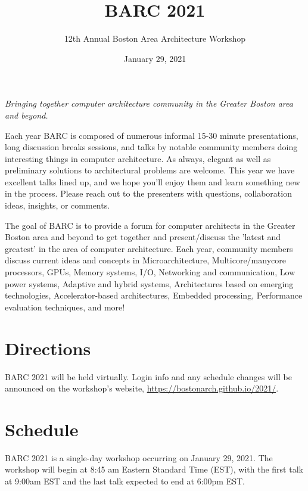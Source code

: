 \documentclass{article}
\title{\Huge\textbf{BARC 2021}}
\author{12th Annual Boston Area Architecture Workshop}
\date{January 29, 2021}
\begin{document}
\maketitle

\large

\textit{Bringing together computer architecture community in the Greater Boston area and beyond.}
\newline

Each year BARC is composed of numerous informal 15-30 minute presentations, long discussion breaks sessions, and talks by notable community members doing interesting things in computer architecture. As always, elegant as well as preliminary solutions to architectural problems are welcome. This year we have excellent talks lined up, and we hope you'll enjoy them and learn something new in the process. Please reach out to the presenters with questions, collaboration ideas, insights, or comments. 
\newline



The goal of BARC is to provide a forum for computer architects in the Greater Boston area and beyond to get together and present/discuss the 'latest and greatest' in the area of computer architecture. Each year, community members discuss current ideas and concepts in Microarchitecture, Multicore/manycore processors, GPUs, Memory systems, I/O, Networking and communication, Low power systems, Adaptive and hybrid systems, Architectures based on emerging technologies, Accelerator-based architectures, Embedded processing, Performance evaluation techniques, and more!



\section*{Directions}
BARC 2021 will be held virtually. Login info and any schedule changes will be announced on the workshop's website, \url{https://bostonarch.github.io/2021/}.





\section*{Schedule}
BARC 2021 is a single-day workshop occurring on January 29, 2021. The workshop will begin at 8:45 am Eastern Standard Time (EST), with the first talk at 9:00am EST and the last talk expected to end at 6:00pm EST.
\newline
\newline
\end{document}
